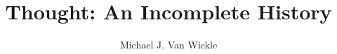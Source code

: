 \NewDocumentCommand{}

\newlength{\titlevspace}
\setlength{\titlevspace}{1cm}

\newcommand{\booktitle}{Thought}
\newcommand{\booksubtitle}{An Incomplete History}
\newcommand{\bookfulltitle}{\booktitle : \booksubtitle}
\title{\bookfulltitle}
\author{Michael J. Van Wickle}

\newcommand*{\customtitlepage}{%
\begin{center}\scshape
\vspace{3cm}
{\huge\booktitle} \\
\vspace*{\titlevspace}
{\large\booksubtitle} \\
{\vspace*{\fill}}
{\large\bfseries Michael Van Wickle} \\
\end{center}}

\newcommand*{\posttitlepage}{%
\begin{center}\small
\begin{spacing}{2.0}
\vspace*{\stretch{1}}
\underline{\texttt{Last Compiled: \today}} \\
\underline{\texttt{Compiled With} \LuaLaTeX}
\vspace{\stretch{3}}\end{spacing}
\end{center}}

\newcommand{\poemauthor}[1]{\nopagebreak{\centering\small\textsc{#1}\par}}



\renewcommand*{\marginfont}{\scriptsize}

\renewcommand{\multfootsep}{,}
\setlength{\footnotesep}{0.9em}

\newcommand{\ftnote}[1]{\footnote{#1}\stepcounter{footcounter}}

